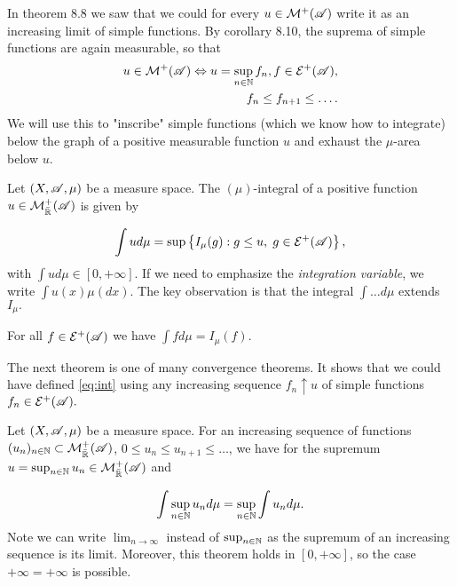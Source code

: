 In theorem 8.8 we saw that we could for every $u\in\mathcal{M}^+(\mathscr{A})$ write it as an increasing limit
of simple functions. By corollary 8.10, the suprema of simple functions are again measurable, so that 
\begin{align*}
    u\in\mathcal{M}^+(\mathscr{A})\Leftrightarrow u=\sup_{n\in\mathbb{N}} f_n, f\in\mathcal{E}^+(\mathscr{A}), \\f_n\leq f_{n+1}\leq\ldots.
\end{align*}
We will use this to "inscribe" simple functions (which we know how to integrate) below the graph of a 
positive measurable function $u$ and exhaust the $\mu$-area below $u$.
\begin{definition}
    Let $(X,\mathscr{A},\mu)$ be a measure space. The $(\mu)$-integral of a positive function $u\in\mathcal{M}_{\bar{\mathbb{R}}}^+(\mathscr{A})$ is given by 

    \begin{equation}
        \label{eq:int}
        \int ud\mu=\sup\left\{ I_\mu(g):g\leq u,\hspace{1mm} g\in\mathcal{E}^+(\mathscr{A}) \right\},
    \end{equation}
    with \(\int ud\mu\in[0,+\infty]\).
    If we need to emphasize the \textit{integration variable}, we write $\int u(x)\mu(dx).$
    The key observation is that the integral $\int\ldots d\mu$ extends $I_\mu.$

\end{definition}
\begin{lemma}
    For all $f\in\mathcal{E}^+(\mathscr{A})$ we have $\int fd\mu = I_\mu(f).$
\end{lemma}

The next theorem is one of many convergence theorems. It shows that we could have defined \ref*{eq:int} using any increasing
sequence $f_n\uparrow u$ of simple functions $f_n\in\mathcal{E}^+(\mathscr{A}).$

\begin{theorem}
    Let $(X,\mathscr{A},\mu)$ be a measure space. For an increasing sequence of functions 
    $(u_n)_{n\in\mathbb{N}}\subset \mathcal{M}_{\bar{\mathbb{R}}}^+(\mathscr{A})$, $0\leq u_n\leq u_{n+1}\leq\ldots$, we have for the supremum $u=\sup_{n\in\mathbb{N}} u_n\in\mathcal{M}_{\bar{\mathbb{R}}}^+(\mathscr{A})$
    and 

    \begin{align}
        \int \sup_{n\in\mathbb{N}} u_nd\mu =\sup_{n\in\mathbb{N}} \int  u_nd\mu.
    \end{align}
Note we can write $\lim_{n\rightarrow \infty}$ instead of $\sup_{n\in\mathbb{N}}$ as the supremum of an increasing sequence
is its limit. Moreover, this theorem holds in $[0,+\infty]$, so the case $+\infty = +\infty$ is possible. 
\end{theorem}

